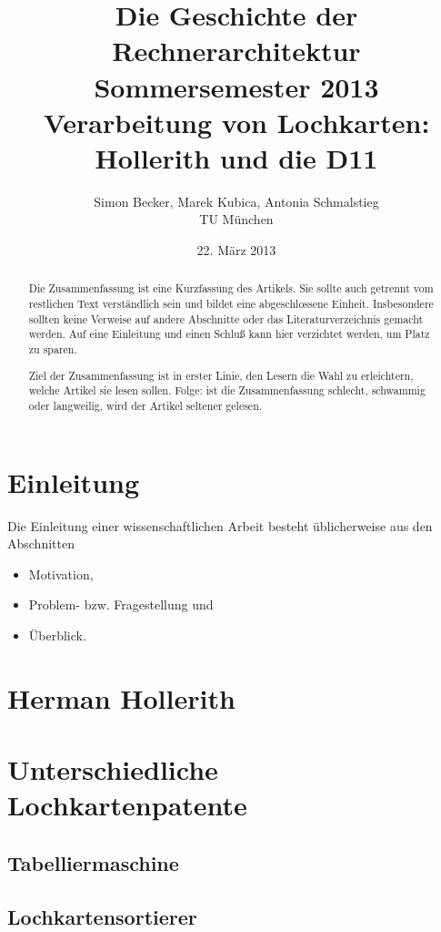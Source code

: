 \documentclass{scrartcl}
\author{Simon Becker, Marek Kubica, Antonia Schmalstieg\\ TU München}
\title{Die Geschichte der Rechnerarchitektur\\
Sommersemester 2013\\
\textbf{Verarbeitung von Lochkarten: Hollerith und die D11}}
\date{22. März 2013}
\begin{document}
\maketitle

\begin{abstract}

Die Zusammenfassung ist eine Kurzfassung des Artikels. Sie sollte
auch getrennt vom restlichen Text verständlich sein
und bildet eine abgeschlossene Einheit. Insbesondere sollten keine
Verweise auf andere Abschnitte
oder das Literaturverzeichnis gemacht werden. Auf eine Einleitung
und einen Schluß kann hier verzichtet werden, um Platz zu sparen.

Ziel der Zusammenfassung ist in erster Linie, den Lesern die Wahl
zu erleichtern, welche Artikel sie lesen sollen. Folge: ist die
Zusammenfassung schlecht, schwammig oder langweilig, wird der
Artikel seltener gelesen.
\end{abstract}

\section{Einleitung}

\label{sec:einleitung}

Die Einleitung einer wissenschaftlichen Arbeit besteht üblicherweise
aus den Abschnitten
\begin{itemize}
	\item Motivation,
	\item Problem- bzw. Fragestellung und
	\item Überblick.
\end{itemize}


\section{Herman Hollerith}


\section{Unterschiedliche Lochkartenpatente}

\subsection{Tabelliermaschine}
\subsection{Lochkartensortierer}
\end{document}
